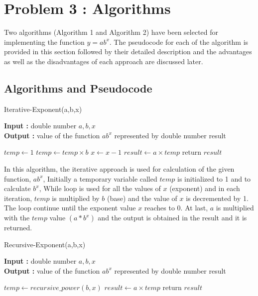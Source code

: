 \documentclass[12pt, a4paper]{article}
\begin{document}
\newpage

\section{Problem 3 : Algorithms}

Two algorithms (Algorithm 1 and Algorithm 2) have been selected for \newline
implementing the function $y = ab^x $. The pseudocode for each of the algorithm is provided in this section followed by their detailed description and the advantages as well as the disadvantages of each approach are discussed later.

\subsection{Algorithms and Pseudocode}
\begin{algorithm}[hbt!]
\caption{Iterative-Exponent(a,b,x)}\label{alg:one}

\hspace*{\algorithmicindent} \textbf{Input : }double number $a,b,x$ \\
\hspace*{\algorithmicindent} \textbf{Output : }value of the function $ab^x$ represented by double number result
\begin{algorithmic}[1]
\STATE $temp \gets 1$
  \STATE $temp \gets temp \times b$
  \STATE $x \gets x - 1$
\ENDWHILE
\STATE $result \gets a \times temp$
\STATE return $result$
\end{algorithmic}
\end{algorithm}

In this algorithm, the iterative approach is used for calculation of the given function, $ab^x$, Initially a temporary  variable called $temp$ is initialized to 1 and to calculate $b^x$, While loop is used for all the values of $x$ (exponent) and in each iteration, $temp$ is multiplied by $b$ (base) and the value of $x$ is decremented by 1. The loop continue until the exponent value $x$ reaches to 0. At last, $a$ is multiplied with the $temp$ value $(a*b^x)$ and the output is obtained in the result and it is returned.

\vspace{40mm}


\begin{algorithm}[hbt!]
\caption{Recursive-Exponent(a,b,x)}\label{alg:two}

\hspace*{\algorithmicindent} \textbf{Input : }double number $a,b,x$ \\
\hspace*{\algorithmicindent} \textbf{Output : }value of the function $ab^x$ represented by double number result
\begin{algorithmic}[1]
\STATE $temp \gets recursive\_power(b,x)$
\STATE $result \gets a \times temp$
\STATE return $result$
\end{algorithmic}
\end{algorithm}
\end{document}
